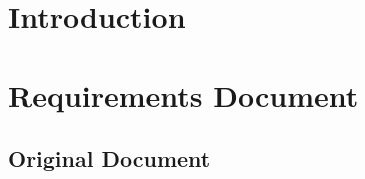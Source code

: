 \documentclass[onecolumn, draftclsnofoot,10pt, compsoc]{IEEEtran}
\begin{document}



\section{Introduction}






\pagebreak
\section{Requirements Document}

\subsection{Original Document}
\end{document}
